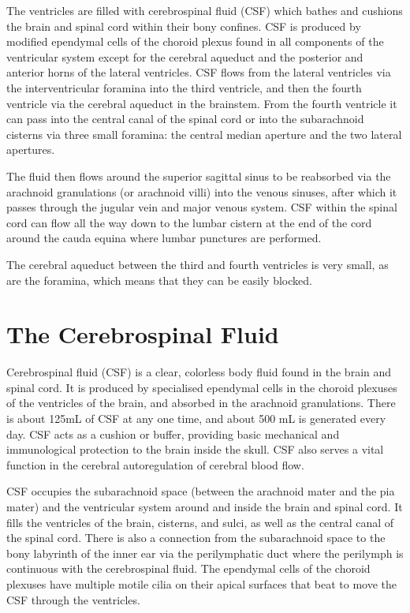 The ventricles are filled with cerebrospinal fluid (CSF) which bathes and cushions the brain and spinal cord within their bony confines. CSF is produced by modified ependymal cells of the choroid plexus found in all components of the ventricular system except for the cerebral aqueduct and the posterior and anterior horns of the lateral ventricles. CSF flows from the lateral ventricles via the interventricular foramina into the third ventricle, and then the fourth ventricle via the cerebral aqueduct in the brainstem. From the fourth ventricle it can pass into the central canal of the spinal cord or into the subarachnoid cisterns via three small foramina: the central median aperture and the two lateral apertures.

The fluid then flows around the superior sagittal sinus to be reabsorbed via the arachnoid granulations (or arachnoid villi) into the venous sinuses, after which it passes through the jugular vein and major venous system. CSF within the spinal cord can flow all the way down to the lumbar cistern at the end of the cord around the cauda equina where lumbar punctures are performed.

The cerebral aqueduct between the third and fourth ventricles is very small, as are the foramina, which means that they can be easily blocked.

\hypertarget{the-cerebrospinal-fluid}{%
\section{The Cerebrospinal Fluid}\label{the-cerebrospinal-fluid}}

Cerebrospinal fluid (CSF) is a clear, colorless body fluid found in the brain and spinal cord. It is produced by specialised ependymal cells in the choroid plexuses of the ventricles of the brain, and absorbed in the arachnoid granulations. There is about 125mL of CSF at any one time, and about 500 mL is generated every day. CSF acts as a cushion or buffer, providing basic mechanical and immunological protection to the brain inside the skull. CSF also serves a vital function in the cerebral autoregulation of cerebral blood flow.

CSF occupies the subarachnoid space (between the arachnoid mater and the pia mater) and the ventricular system around and inside the brain and spinal cord. It fills the ventricles of the brain, cisterns, and sulci, as well as the central canal of the spinal cord. There is also a connection from the subarachnoid space to the bony labyrinth of the inner ear via the perilymphatic duct where the perilymph is continuous with the cerebrospinal fluid. The ependymal cells of the choroid plexuses have multiple motile cilia on their apical surfaces that beat to move the CSF through the ventricles.

